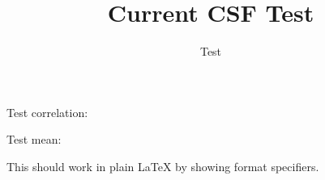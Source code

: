 \documentclass{article}
\title{Current CSF Test}
\author{Test}
\begin{document}
\maketitle

Test correlation: 

Test mean: 

This should work in plain LaTeX by showing format specifiers.
\end{document}
